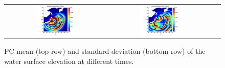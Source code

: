 \begin{figure}[h]
\begin{tabular}{ccc}
\hspace*{-65pt}
\includegraphics[width=0.45\textwidth]{./figures/sigma2d3.pdf} &
\hspace*{-65pt}
\includegraphics[width=0.45\textwidth]{./figures/sigma2d4.pdf}
\end{tabular}
\caption{PC mean (top row) and standard deviation (bottom row) of the water surface elevation at different times.}
\label{fig:mean2d}
\end{figure}
      
